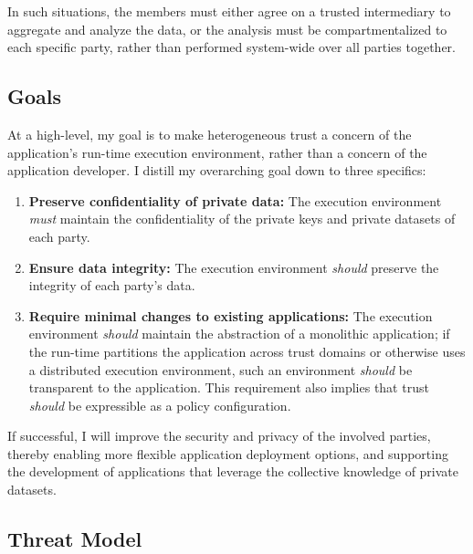 In such situations, the members must either agree on a trusted intermediary to
aggregate and analyze the data, or the analysis must be compartmentalized to
each specific party, rather than performed system-wide  over all parties
together.


%


\subsection{Goals}
At a high-level, my goal is to make heterogeneous trust a concern
of the application's run-time execution environment, rather than a concern of
the application developer.
%
I distill my overarching goal down to three specifics:

\begin{enumerate}
\item \textbf{Preserve confidentiality of private data:}
    The execution environment \emph{must} maintain the confidentiality of the
    private keys and private datasets of each party.

\item \textbf{Ensure data integrity:} 
    The execution environment \emph{should} preserve the integrity of each
    party's data.

\item \textbf{Require minimal changes to existing applications:}
    The execution environment \emph{should} maintain the abstraction of a
    monolithic application; if the run-time partitions the application
    across trust domains or otherwise uses a distributed execution
    environment, such an environment \emph{should} be transparent to the
    application.  
    This requirement also implies that trust \emph{should} be
    expressible as a policy configuration.
\end{enumerate}

If successful, I will improve the security and privacy of the involved parties,
thereby enabling more flexible application deployment options, and supporting
the development of applications that leverage the collective knowledge of
private datasets.


\subsection{Threat Model}

